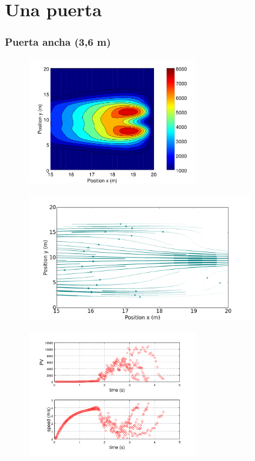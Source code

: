 \section{Una puerta}

\subsubsection{Puerta ancha (3,6 m)}

\begin{figure}[H]
    \centering
    \includegraphics[height=5.5cm]{figuras/press_225p_v4_onedoor_3_6.png}
    \caption[width=5cm]{\centering\textit{}}
    \label{sintesis}
\end{figure}

\begin{figure}[H]
    \centering
    \includegraphics[height=5.5cm]{figuras/flujo_door_3_6m.png}
    \caption[width=5cm]{\centering\textit{}}
    \label{sintesis}
\end{figure}

\begin{figure}[H]
    \centering
    \includegraphics[height=5.5cm]{figuras/pv_vel_t_100_3_6.png}
    \caption[width=5cm]{\centering\textit{}}
    \label{sintesis}
\end{figure}

